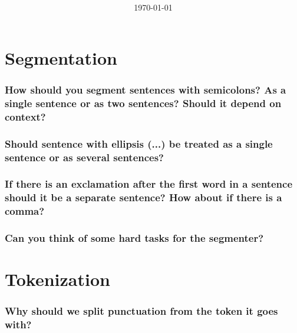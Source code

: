 \documentclass[fleqn]{article}
\title{
	\vspace{2in}
	\textmd{\textbf{\hmwkClass\ \hmwkTitle}}\\
	\large{\hmwkClassInstructor}\\
	\vspace{3in}
}
\author{\textbf{\hmwkAuthorName}}
\date{\today} %
\begin{document}
	\maketitle


\newpage
\newpage
\section{Segmentation}
\subsubsection{How should you segment sentences with semicolons? As a single sentence or as two sentences? Should it depend on context?}

\subsubsection{Should sentence with ellipsis (...) be treated as a single sentence or as several sentences?}

\subsubsection{If there is an exclamation after the first word in a sentence should it be a separate sentence? How about if there is a comma?}

\subsubsection{Can you think of some hard tasks for the segmenter?}

\section{Tokenization}
\subsubsection{Why should we split punctuation from the token it goes with?}
\end{document}
